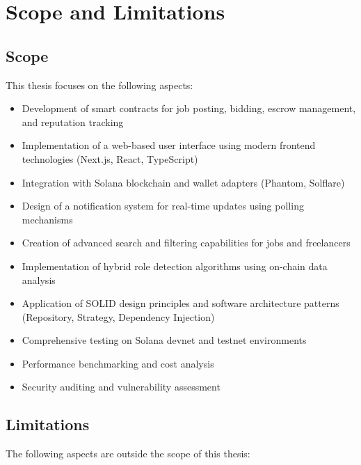 \documentclass[a4paper,13pt,twoside]{report}
\theoremstyle{definition}
\begin{document}
\section{Scope and Limitations}

\subsection{Scope}

This thesis focuses on the following aspects:

\begin{itemize}
    \item Development of smart contracts for job posting, bidding, escrow management, and reputation tracking
    \item Implementation of a web-based user interface using modern frontend technologies (Next.js, React, TypeScript)
    \item Integration with Solana blockchain and wallet adapters (Phantom, Solflare)
    \item Design of a notification system for real-time updates using polling mechanisms
    \item Creation of advanced search and filtering capabilities for jobs and freelancers
    \item Implementation of hybrid role detection algorithms using on-chain data analysis
    \item Application of SOLID design principles and software architecture patterns (Repository, Strategy, Dependency Injection)
    \item Comprehensive testing on Solana devnet and testnet environments
    \item Performance benchmarking and cost analysis
    \item Security auditing and vulnerability assessment
\end{itemize}

\subsection{Limitations}

The following aspects are outside the scope of this thesis:
\end{document}
